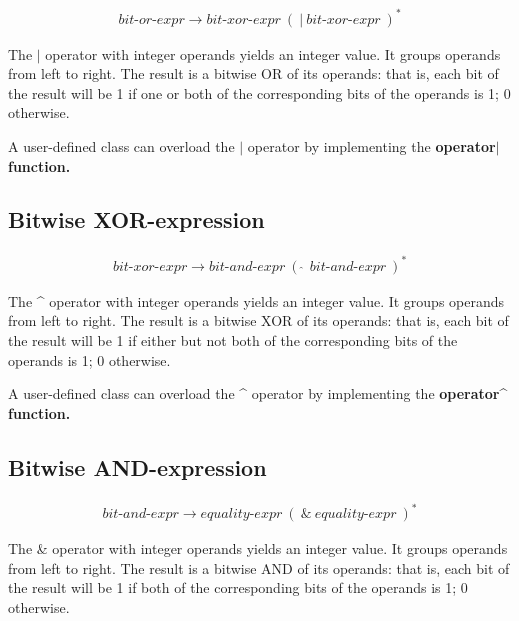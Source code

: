 \documentclass[a4paper,oneside,11pt]{article}
\begin{document}
\begin{align*}
bit\textrm{-}or\textrm{-}expr \rightarrow \hyperref[bitxor]{bit\textrm{-}xor\textrm{-}expr} \> ( \> \texttt{|} \>
\hyperref[bitxor]{bit\textrm{-}xor\textrm{-}expr} \> )^*
\end{align*}

The $|$ operator with integer operands yields an integer value. It groups operands from left to right.
The result is a bitwise OR of its operands:
that is, each bit of the result will be 1 if one or both of the corresponding bits of the operands is 1; 0 otherwise.

A user-defined class can overload the $|$ operator by implementing the \bf{operator$|$} function.

\subsection{Bitwise XOR-expression}\label{bitxor}

\begin{align*}
bit\textrm{-}xor\textrm{-}expr \rightarrow \hyperref[bitand]{bit\textrm{-}and\textrm{-}expr} \> ( \> \hat{} \>\>
\hyperref[bitand]{bit\textrm{-}and\textrm{-}expr} \>)^*
\end{align*}

The \^{} operator with integer operands yields an integer value. It groups operands from left to right.
The result is a bitwise XOR of its operands:
that is, each bit of the result will be 1 if either but not both of the corresponding bits of the operands is 1; 0 otherwise.

A user-defined class can overload the \^{} operator by implementing the \bf{operator\^{}} function.

\subsection{Bitwise AND-expression}\label{bitand}

\begin{align*}
bit\textrm{-}and\textrm{-}expr \rightarrow \hyperref[equality]{equality\textrm{-}expr} \> ( \> \texttt{\&} \> \hyperref[equality]{equality\textrm{-}expr} \> )^*
\end{align*}

The \& operator with integer operands yields an integer value. It groups operands from left to right.
The result is a bitwise AND of its operands:
that is, each bit of the result will be 1 if both of the corresponding bits of the operands is 1; 0 otherwise.
\end{document}
